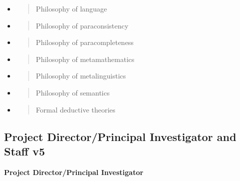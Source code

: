 \begin{itemize}
\begin{quote}
  \end{quote}
\item
  \begin{quote}
  Philosophy of language
  \end{quote}
\item
  \begin{quote}
  Philosophy of paraconsistency
  \end{quote}
\item
  \begin{quote}
  Philosophy of paracompleteness
  \end{quote}
\item
  \begin{quote}
  Philosophy of metamathematics
  \end{quote}
\item
  \begin{quote}
  Philosophy of metalinguistics
  \end{quote}
\item
  \begin{quote}
  Philosophy of semantics
  \end{quote}
\item
  \begin{quote}
  Formal deductive theories
  \end{quote}
\end{itemize}

\hypertarget{project-directorprincipal-investigator-and-staff-v5}{%
\subsection{Project Director/Principal Investigator and Staff
v5}\label{project-directorprincipal-investigator-and-staff-v5}}

\textbf{Project Director/Principal Investigator}


